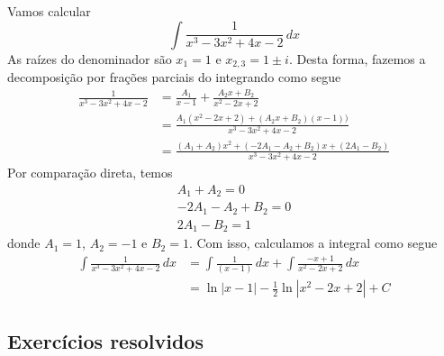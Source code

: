 \begin{ex}
  Vamos calcular
  \begin{equation}
    \int \frac{1}{x^3 - 3x^2 + 4x -2}\,dx
  \end{equation}
  As raízes do denominador são $x_1=1$ e $x_{2,3} = 1 \pm i$. Desta forma, fazemos a decomposição por frações parciais do integrando como segue 
  \begin{align}
    \frac{1}{x^3 - 3x^2 + 4x -2} &= \frac{A_1}{x-1} + \frac{A_2x + B_2}{x^2 - 2x + 2}\\
                                 &= \frac{A_1(x^2-2x+2) + (A_2x+B_2)(x-1))}{x^3-3x^2+4x-2}\\
                                 &= \frac{(A_1+A_2)x^2+(-2A_1-A_2+B_2)x+(2A_1-B_2)}{x^3-3x^2+4x-2}
  \end{align}
  Por comparação direta, temos
  \begin{gather}
    A_1+A_2 = 0\\
    -2A_1-A_2+B_2 = 0\\
    2A_1-B_2 = 1
  \end{gather}
  donde $A_1=1$, $A_2=-1$ e $B_2=1$. Com isso, calculamos a integral como segue
  \begin{align}
    \int \frac{1}{x^3 - 3x^2 + 4x -2}\,dx &= \int\frac{1}{(x-1)}\,dx + \int\frac{-x+1}{x^2 - 2x + 2}\,dx\\
                                          &= \ln|x-1| -\frac{1}{2}\ln|x^2-2x+2| + C
  \end{align}
\end{ex}

\subsection{Exercícios resolvidos}


